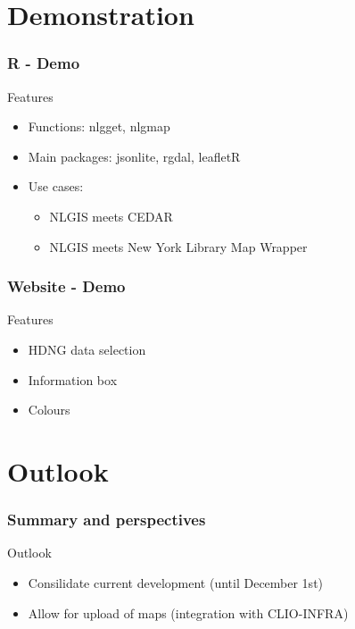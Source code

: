 \documentclass{beamer}
\begin{document}
\section{Demonstration}
\begin{frame}
	\frametitle{R - Demo}
	Features
		\begin{itemize}
			\item Functions: nlgget, nlgmap
			\item Main packages: jsonlite, rgdal, leafletR
			\item Use cases: 
				\begin{itemize}
					\item NLGIS meets CEDAR
					\item NLGIS meets New York Library Map Wrapper
				\end{itemize}		
		\end{itemize}
\end{frame}
\begin{frame}
	\frametitle{Website - Demo}
	Features
		\begin{itemize}
			\item HDNG data selection
			\item Information box
			\item Colours
		\end{itemize}
\end{frame}
\section{Outlook}
\begin{frame}
	\frametitle{Summary and perspectives}
	Outlook
		\begin{itemize}
			\item Consilidate current development (until December 1st)
			\item Allow for upload of maps (integration with CLIO-INFRA)
		\end{itemize}
\end{frame}
\end{document}
